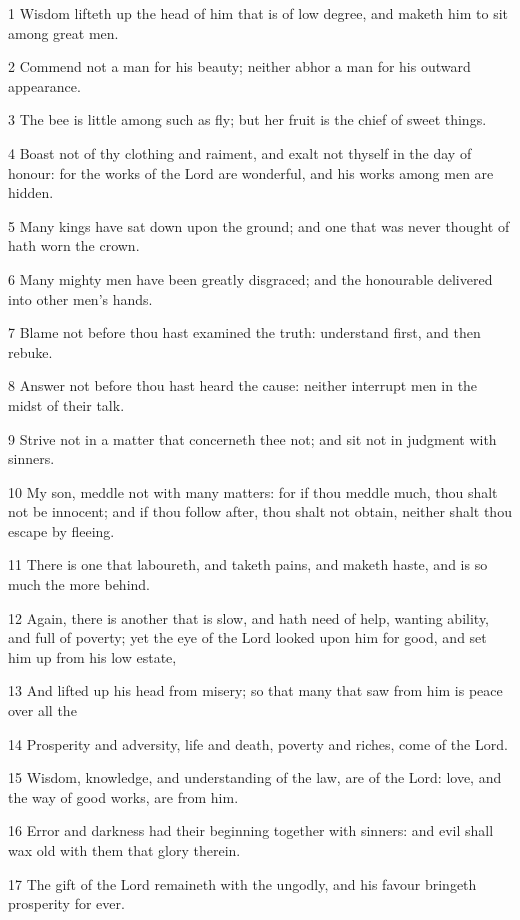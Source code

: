 \par 1 Wisdom lifteth up the head of him that is of low degree, and maketh him to sit among great men.
\par 2 Commend not a man for his beauty; neither abhor a man for his outward appearance.
\par 3 The bee is little among such as fly; but her fruit is the chief of sweet things.
\par 4 Boast not of thy clothing and raiment, and exalt not thyself in the day of honour: for the works of the Lord are wonderful, and his works among men are hidden.
\par 5 Many kings have sat down upon the ground; and one that was never thought of hath worn the crown.
\par 6 Many mighty men have been greatly disgraced; and the honourable delivered into other men's hands.
\par 7 Blame not before thou hast examined the truth: understand first, and then rebuke.
\par 8 Answer not before thou hast heard the cause: neither interrupt men in the midst of their talk.
\par 9 Strive not in a matter that concerneth thee not; and sit not in judgment with sinners.
\par 10 My son, meddle not with many matters: for if thou meddle much, thou shalt not be innocent; and if thou follow after, thou shalt not obtain, neither shalt thou escape by fleeing.
\par 11 There is one that laboureth, and taketh pains, and maketh haste, and is so much the more behind.
\par 12 Again, there is another that is slow, and hath need of help, wanting ability, and full of poverty; yet the eye of the Lord looked upon him for good, and set him up from his low estate,
\par 13 And lifted up his head from misery; so that many that saw from him is peace over all the
\par 14 Prosperity and adversity, life and death, poverty and riches, come of the Lord.
\par 15 Wisdom, knowledge, and understanding of the law, are of the Lord: love, and the way of good works, are from him.
\par 16 Error and darkness had their beginning together with sinners: and evil shall wax old with them that glory therein.
\par 17 The gift of the Lord remaineth with the ungodly, and his favour bringeth prosperity for ever.

